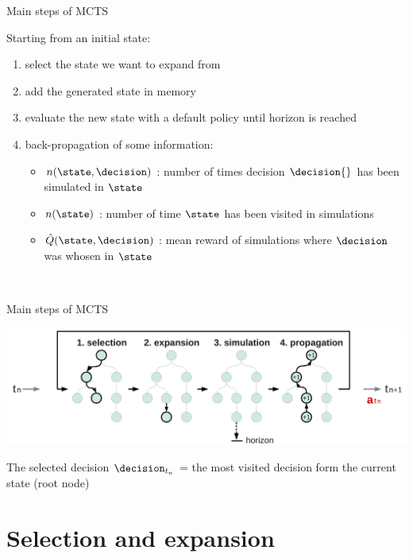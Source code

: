 \begin{frame}{Main steps of MCTS}
{\begin{center}
        \end{center}
    }
    \begin{small}
        Starting from an initial state:%
        \begin{enumerate}
            \item<1-> select the state we want to expand from
            \item<2-> add the generated state in memory
            \item<3-> evaluate the new state with a default policy until horizon is reached
            \item<4-> back-propagation of some information:
            \begin{itemize}
                \item $n(\state,\decision)$ : number of times decision $\decision{}$ has been simulated in $\state$
                \item $n(\state)$ : number of time $\state$ has been visited in simulations
                \item $\hat{Q}(\state,\decision)$ : mean reward of simulations where $\decision$ was whosen in $\state$
            \end{itemize}
        \end{enumerate}
        ~\\
    \end{small}
\end{frame}


\begin{frame}{Main steps of MCTS}
    \begin{center}
        \includegraphics[width=.75\linewidth]{figs/tree10f}
    \end{center}

    \begin{block}{The selected decision}
        $\decision_{t_n}$ = the most visited decision form the current state (root node)
    \end{block}
\end{frame}


\section{Selection and expansion}
